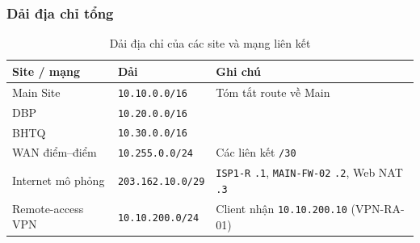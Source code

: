 \subsubsection{Dải địa chỉ tổng}
\begin{small}
\setlength{\tabcolsep}{4pt}
\begin{longtable}{|p{3.4cm}|p{3.2cm}|p{7.0cm}|}
\caption{Dải địa chỉ của các site và mạng liên kết} \label{tab:ip_ranges} \\
\hline
\textbf{Site / mạng} & \textbf{Dải} & \textbf{Ghi chú} \\ \hline
\endhead
Main Site & \texttt{10.10.0.0/16} & Tóm tắt route về Main \\ \hline
DBP & \texttt{10.20.0.0/16} & \\ \hline
BHTQ & \texttt{10.30.0.0/16} & \\ \hline
WAN điểm--điểm & \texttt{10.255.0.0/24} & Các liên kết \texttt{/30} \\ \hline
Internet mô phỏng & \texttt{203.162.10.0/29} & \texttt{ISP1-R} \texttt{.1}, \texttt{MAIN-FW-02} \texttt{.2}, Web NAT \texttt{.3} \\ \hline
Remote-access VPN & \texttt{10.10.200.0/24} & Client nhận \texttt{10.10.200.10} (VPN-RA-01) \\ \hline
\end{longtable}
\end{small}

